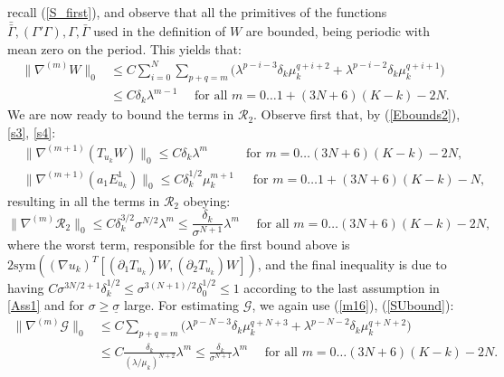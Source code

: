 \documentclass[reqno,twoside,11pt]{amsart}
\newcommand{\sym}{\mathrm{sym}}
\newcommand*{\dbar}[1]{\bar{\bar{#1}}}
\numberwithin{equation}{section}
\theoremstyle{plain}
\theoremstyle{definition}
\begin{document}
recall (\ref{S_first}), and observe that all  the primitives of the functions $\dbar\Gamma,
(\Gamma'\Gamma), \Gamma, \bar\Gamma$ used in the definition of $W$ are
bounded, being periodic with mean zero on the period. This yields that:
\begin{equation}\label{m14}
\begin{split}
\|\nabla^{(m)}W\|_0&\leq C\sum_{i=0}^N\sum_{p+q=m}\Big(\lambda^{p-i-3}\delta_k\mu_k^{q+i+2}
+ \lambda^{p-i-2}\delta_k\mu_k^{q+i+1}\Big) \\ & \leq C
\delta_k\lambda^{m-1} \quad\mbox{ for all } m=0\ldots 1+(3N+6)(K-k)-2N.
\end{split}
\end{equation}
We are now ready to bound the terms in $\mathcal{R}_2$. Observe first
that, by (\ref{Ebounds2}), \ref{s3}, \ref{s4}:
\begin{equation*}
\begin{split}
& \|\nabla^{(m+1)}(T_{u_k}W)\|_0\leq C\delta_k\lambda^m \qquad \quad\mbox{
  for } m=0\ldots (3N+6)(K-k)-2N,
\\ &\|\nabla^{(m+1)}(a_1E^1_{u_k})\|_0\leq C\delta_k^{1/2}\mu_k^{m+1}
\, \quad \mbox{ for } m=0\ldots 1+(3N+6)(K-k)-N,
\end{split}
\end{equation*}
resulting in all the terms in $\mathcal{R}_2$ obeying:
\begin{equation}\label{m15}
\|\nabla^{(m)}\mathcal{R}_2\|_0\leq C\delta_k^{3/2}\sigma^{N/2}\lambda^m \leq
\frac{\delta_k}{\sigma^{N+1}}\lambda^m\quad \mbox{ for all } 
m=0\ldots (3N+6)(K-k)-2N,
\end{equation}
where the worst term, responsible for the first bound above is
$2\sym((\nabla u_k)^T[(\partial_1T_{u_k})W, (\partial_2T_{u_k})W])$,
and the final inequality is due to having 
$C\sigma^{3N/2+1}\delta_k^{1/2}\leq \sigma^{3(N+1)/2}\delta_0^{1/2} \leq 1$ 
according to the last assumption in \ref{Ass1} and for
$\sigma\geq\underline\sigma$ large. For estimating $\mathcal{G}$,
we again use (\ref{m16}), (\ref{SUbound}):
\begin{equation}\label{m17}
\begin{split}
\|\nabla^{(m)}\mathcal{G}\|_0& \leq C\sum_{p+q=m}\Big(\lambda^{p-N-3}\delta_k\mu_k^{q+N+3}
+ \lambda^{p-N-2}\delta_k\mu_k^{q+N+2}\Big) \\ & \leq C
\frac{\delta_k}{(\lambda/\mu_k)^{N+2}}\lambda^m 
\leq \frac{\delta_k}{\sigma^{N+1}}\lambda^m
\quad \mbox{ for all } m=0\ldots (3N+6)(K-k)-2N.
\end{split}
\end{equation}
\end{document}

